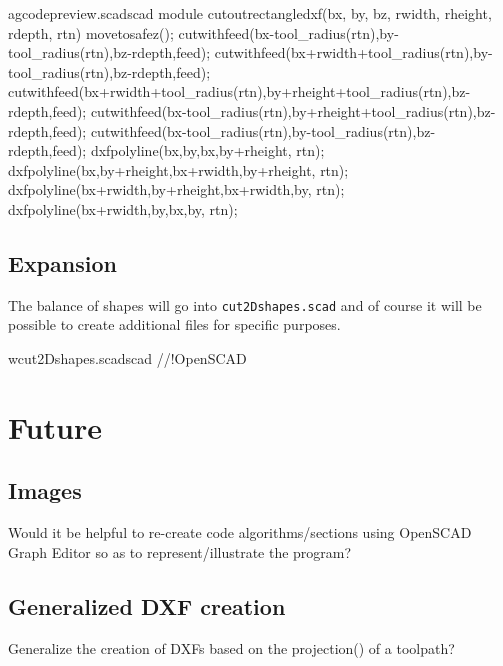 \documentclass{ltxdoc}
\begin{document}
\lstset{firstnumber=\thegcpscad}
\begin{writecode}{a}{gcodepreview.scad}{scad}
module cutoutrectangledxf(bx, by, bz, rwidth, rheight, rdepth, rtn) {
  movetosafez();
  cutwithfeed(bx-tool_radius(rtn),by-tool_radius(rtn),bz-rdepth,feed);
  cutwithfeed(bx+rwidth+tool_radius(rtn),by-tool_radius(rtn),bz-rdepth,feed);
  cutwithfeed(bx+rwidth+tool_radius(rtn),by+rheight+tool_radius(rtn),bz-rdepth,feed);
  cutwithfeed(bx-tool_radius(rtn),by+rheight+tool_radius(rtn),bz-rdepth,feed);
  cutwithfeed(bx-tool_radius(rtn),by-tool_radius(rtn),bz-rdepth,feed);
  dxfpolyline(bx,by,bx,by+rheight, rtn);
  dxfpolyline(bx,by+rheight,bx+rwidth,by+rheight, rtn);
  dxfpolyline(bx+rwidth,by+rheight,bx+rwidth,by, rtn);
  dxfpolyline(bx+rwidth,by,bx,by, rtn);
}

\end{writecode}
\addtocounter{gcpscad}{13}

\subsection{Expansion}

The balance of shapes will go into \texttt{cut2Dshapes.scad} and of course it will be 
possible to create additional files for specific purposes.

\lstset{firstnumber=1}
\begin{writecode}{w}{cut2Dshapes.scad}{scad}
//!OpenSCAD

\end{writecode}
\addtocounter{cuttwod}{2}

\section{Future}

\subsection{Images}

Would it be helpful to re-create code algorithms/sections using OpenSCAD Graph Editor 
so as to represent/illustrate the program?

\subsection{Generalized DXF creation}

Generalize the creation of DXFs based on the projection() of a toolpath?
\end{document}
